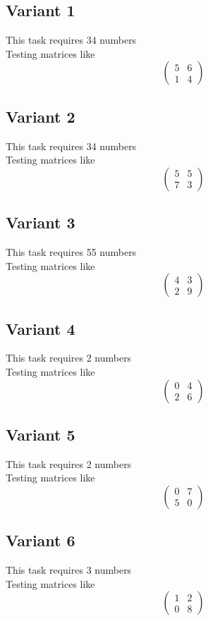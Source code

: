 \documentclass[11pt]{article}
\begin{document}
\subsection*{Variant 1}
This task requires 34 numbers\\
Testing matrices like \[ \begin{pmatrix} 5 & 6\\ 1 & 4 \end{pmatrix} \]

\subsection*{Variant 2}
This task requires 34 numbers\\
Testing matrices like \[ \begin{pmatrix} 5 & 5\\ 7 & 3 \end{pmatrix} \]

\subsection*{Variant 3}
This task requires 55 numbers\\
Testing matrices like \[ \begin{pmatrix} 4 & 3\\ 2 & 9 \end{pmatrix} \]

\subsection*{Variant 4}
This task requires 2 numbers\\
Testing matrices like \[ \begin{pmatrix} 0 & 4\\ 2 & 6 \end{pmatrix} \]

\subsection*{Variant 5}
This task requires 2 numbers\\
Testing matrices like \[ \begin{pmatrix} 0 & 7\\ 5 & 0 \end{pmatrix} \]

\subsection*{Variant 6}
This task requires 3 numbers\\
Testing matrices like \[ \begin{pmatrix} 1 & 2\\ 0 & 8 \end{pmatrix} \]
\end{document}
